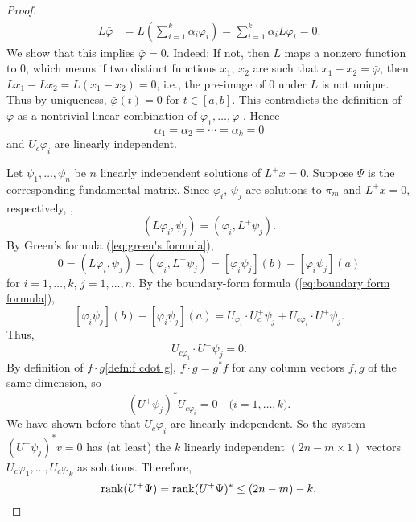 \documentclass[11pt, oneside, a4paper]{article}
\begin{document}
\begin{proof}
{    \begin{align*}
        L\bar{\varphi} &= L\left(\sum_{i=1}^k \alpha_i\varphi_i\right) = \sum_{i=1}^k \alpha_i L\varphi_i = 0.
    \end{align*}
    We show that this implies $\bar{\varphi}=0$. Indeed: If not, then $L$ maps a nonzero function to $0$, which means if two distinct functions $x_1$, $x_2$ are such that $x_1-x_2=\bar{\varphi}$, then $Lx_1-Lx_2=L(x_1-x_2)=0$, i.e., the pre-image of $0$ under $L$ is not unique. 
    }
    Thus by uniqueness, $\bar{\varphi}(t)=0$ for $t\in [a,b]$. This contradicts the definition of $\bar{\varphi}$ as a nontrivial linear combination of $\varphi_1,\ldots,\varphi$ . Hence
    \[\alpha_1=\alpha_2=\cdots=\alpha_k=0\]
    and $U_c\varphi_i$ are linearly independent.

    Let $\psi_1,\ldots,\psi_n$ be $n$ linearly independent solutions of $L^+x=0$. Suppose $\Psi$ is the corresponding fundamental matrix. Since $\varphi_i$, $\psi_j$ are solutions to $\pi_m$ and $L^+x=0$, respectively, ,
    \[(L\varphi_i, \psi_j) = (\varphi_i, L^+\psi_j).\]
    By Green's formula (\ref{eq:green's formula}),
    \[0 = (L\varphi_i, \psi_j) - (\varphi_i, L^+\psi_j) = [\varphi_i\psi_j](b) - [\varphi_i\psi_j](a)\]
    for $i=1,\ldots,k$, $j=1,\ldots,n$. By the boundary-form formula (\ref{eq:boundary form formula}),
    \[[\varphi_i\psi_j](b) - [\varphi_i\psi_j](a) = U_{\varphi_i}\cdot U_c^+\psi_j + U_{c\varphi_i}\cdot U^+\psi_j.\]
    Thus,
    \[U_{c\varphi_i}\cdot U^+\psi_j = 0.\]
    By definition of $f\cdot g$\ref{defn:f cdot g}, $f\cdot g=g^*f$ for any column vectors $f, g$ of the same dimension, so
    \[(U^+\psi_j)^*U_{c\varphi_i}=0\quad\mbox{($i=1,\ldots,k$)}.\]
    We have shown before that $U_c\varphi_i$ are linearly independent. So the system $(U^+\psi_j)^*v=0$ has (at least) the $k$ linearly independent $(2n-m\times 1)$ vectors $U_c\varphi_1,\ldots, U_c\varphi_k$ as solutions. Therefore,
    \[\operatorname{rank}(U^+\Psi) = \operatorname{rank}(U^+\Psi)^*\leq (2n-m)-k.\]


\end{proof}
\end{document}
